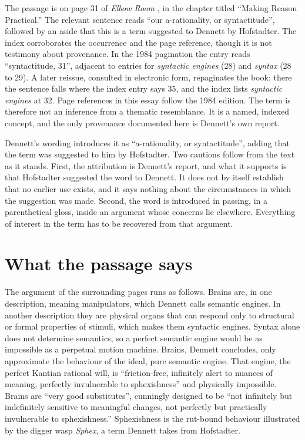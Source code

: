 \documentclass[11pt]{article}
\begin{document}
The passage is on page 31 of \emph{Elbow Room} \cite{dennett1984}, in the chapter titled ``Making Reason Practical.'' The relevant sentence reads ``our a-rationality, or syntactitude'', followed by an aside that this is a term suggested to Dennett by Hofstadter. The index corroborates the occurrence and the page reference, though it is not testimony about provenance. In the 1984 pagination the entry reads ``syntactitude, 31'', adjacent to entries for \emph{syntactic engines} (28) and \emph{syntax} (28 to 29). A later reissue, consulted in electronic form, repaginates the book: there the sentence falls where the index entry says 35, and the index lists \emph{syntactic engines} at 32. Page references in this essay follow the 1984 edition. The term is therefore not an inference from a thematic resemblance. It is a named, indexed concept, and the only provenance documented here is Dennett's own report.

Dennett's wording introduces it as ``a-rationality, or syntactitude'', adding that the term was suggested to him by Hofstadter. Two cautions follow from the text as it stands. First, the attribution is Dennett's report, and what it supports is that Hofstadter suggested the word to Dennett. It does not by itself establish that no earlier use exists, and it says nothing about the circumstances in which the suggestion was made. Second, the word is introduced in passing, in a parenthetical gloss, inside an argument whose concerns lie elsewhere. Everything of interest in the term has to be recovered from that argument.

\section{What the passage says}

The argument of the surrounding pages runs as follows. Brains are, in one description, meaning manipulators, which Dennett calls semantic engines. In another description they are physical organs that can respond only to structural or formal properties of stimuli, which makes them syntactic engines. Syntax alone does not determine semantics, so a perfect semantic engine would be as impossible as a perpetual motion machine. Brains, Dennett concludes, only approximate the behaviour of the ideal, pure semantic engine. That engine, the perfect Kantian rational will, is ``friction-free, infinitely alert to nuances of meaning, perfectly invulnerable to sphexishness'' and physically impossible. Brains are ``very good substitutes'', cunningly designed to be ``not infinitely but indefinitely sensitive to meaningful changes, not perfectly but practically invulnerable to sphexishness.'' Sphexishness is the rut-bound behaviour illustrated by the digger wasp \emph{Sphex}, a term Dennett takes from Hofstadter.
\end{document}
